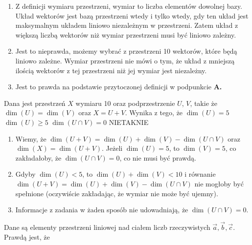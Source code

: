\begin{solutions}
    \begin{enumerate}[\bf A.]
        \item Z definicji wymiaru przestrzeni, wymiar to liczba elementów dowolnej bazy. Układ wektorów jest bazą przestrzeni wtedy i tylko wtedy, gdy ten układ jest maksymalnym układem liniowo niezależnym w przestrzeni. Zatem układ z większą liczbą wektorów niż wymiar przestrzeni musi być liniowo zależny.

        \item Jest to nieprawda, możemy wybrać z przestrzeni 10 wektorów, które będą liniowo zależne. Wymiar przestrzeni nie mówi o tym, że układ z mniejszą ilością wektorów z tej przestrzeni niż jej wymiar jest niezależny.

        \item Jest to prawda na podstawie przytoczonej definicji w podpunkcie \textbf{A.}
    \end{enumerate}

    \sol Dana jest przestrzeń $X$ wymiaru 10 oraz podprzestrzenie $U$, $V$, takie że $\dim(U) = \dim(V)$ oraz $X = U + V$. Wynika z tego, że
    \answerss
    {$\dim(U) = 5$}
    {$\dim(U) \geq 5$}
    {$\dim(U \cap V) = 0$}
    {NIE}{TAK}{NIE}

    \begin{enumerate}[\bf A.]
        \item Wiemy, że $\dim(U+V)=\dim(U)+\dim(V)-\dim(U \cap V)$ oraz $\dim(X)=\dim(U+V)$. Jeżeli $\dim(U)=5$, to $\dim(V)=5$, co zakładałoby, że $\dim(U \cap V)=0$, co nie musi być prawdą.

        \item Gdyby $\dim(U)<5$, to $\dim(U) + \dim(V) < 10$ i równanie $\dim(U+V)=\dim(U)+\dim(V)-\dim(U \cap V)$ nie mogłoby być spełnione (oczywiście zakładając, że wymiar nie może być ujemny).

        \item Informacje z zadania w żaden sposób nie udowadniają, że $\dim(U \cap V) = 0$.
    \end{enumerate}

    \sol Dane są elementy przestrzeni liniowej nad ciałem liczb rzeczywistych $\Vec{a}, \Vec{b}, \Vec{c}$. Prawdą jest, że


\end{solutions}
